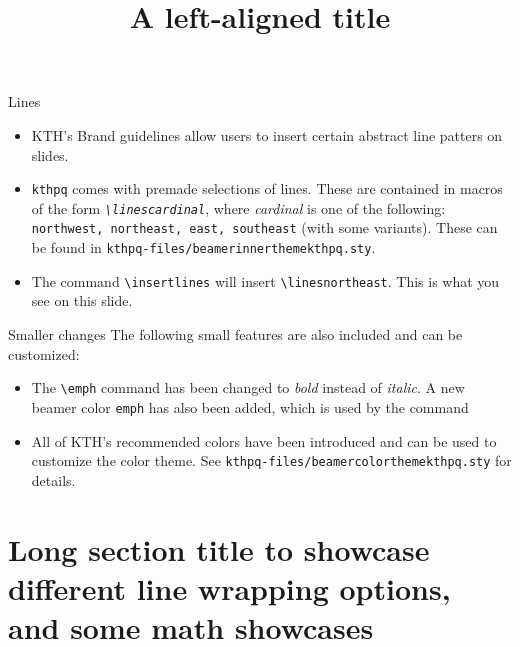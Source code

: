 \documentclass[17pt, t, lualatex]{beamer}
\def\kthpq{\texttt{kthpq}}
\begin{document}
\title{A left-aligned title}

\inserttitlepage[left]

\begin{frame}{Lines}
\insertlines
\begin{minipage}{.65\paperwidth}
\begin{itemize}
\item KTH's Brand guidelines allow users to insert certain abstract line patters on slides.
\item \kthpq{} comes with premade selections of lines. These are contained in macros of the form \emph{\texttt{\textbackslash lines\textnormal{\textit{cardinal}}}}, where \textit{cardinal} is one of the following: \texttt{northwest, northeast, east, southeast} (with some variants). These can be found in \texttt{kthpq-files/beamerinnerthemekthpq.sty}.
\item The command \texttt{\textbackslash insertlines} will insert \texttt{\textbackslash linesnortheast}. This is what you see on this slide.
\end{itemize}
\end{minipage}
\end{frame}

\begin{frame}[fragile=singleslide]{Smaller changes}
The following small features are also included and can be customized:
\begin{itemize}
\item The \verb|\emph| command has been changed to \emph{bold} instead of \textit{ italic}. A new beamer color \verb|emph| has also been added, which is used by the command
\item All of KTH's recommended colors have been introduced and can be used to customize the color theme. See \texttt{kthpq-files/beamercolorthemekthpq.sty} for details.
\end{itemize}
\end{frame}

\section{Long section title to showcase different line wrapping options, and some math showcases}

\insertsectionpage
\end{document}
